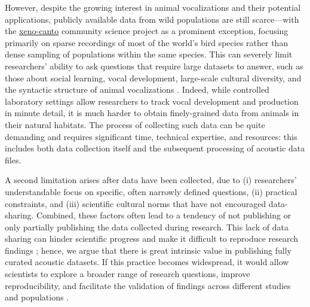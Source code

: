 However, despite the growing interest in animal vocalizations and their potential applications, publicly available data from wild populations are still scarce---with the \href{https://xeno-canto.org/}{xeno-canto} community science project as a prominent exception, focusing primarily on sparse recordings of most of the world's bird species rather than dense sampling of populations within the same species. This can severely limit researchers' ability to ask questions that require large datasets to answer, such as those about social learning, vocal development, large-scale cultural diversity, and the syntactic structure of animal vocalizations \parencite{aplin2019, kollmorgen2020, lachlan2018, sainburg2019}. Indeed, while controlled laboratory settings allow researchers to track vocal development and production in minute detail, it is much harder to obtain finely-grained data from animals in their natural habitats. The process of collecting such data can be quite demanding and requires significant time, technical expertise, and resources: this includes both data collection itself and the subsequent processing of acoustic data files.

A second limitation arises after data have been collected, due to (i) researchers' understandable focus on specific, often narrowly defined questions, (ii) practical constraints, and (iii) scientific cultural norms that have not encouraged data-sharing. Combined, these factors often lead to a tendency of not publishing or only partially publishing the data collected during research. This lack of data sharing can hinder scientific progress and make it difficult to reproduce research findings \parencite{jenkins2023, powers2019, reichman2011, wilkinson2016}; hence, we argue that there is great intrinsic value in publishing fully curated acoustic datasets. If this practice becomes widespread, it would allow scientists to explore a broader range of research questions, improve reproducibility, and facilitate the validation of findings across different studies and populations \parencite{hersh2023, powers2019}.

